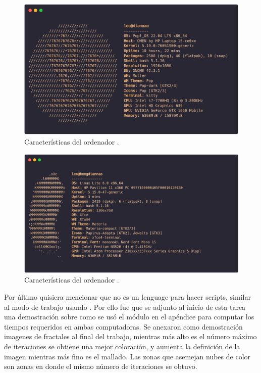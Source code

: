 \begin{figure}[ht!]
    \centering
    \includegraphics[scale=0.2]{../figures/diannao-specs}
    \caption{Características del ordenador {\diannao}.}
    \label{fig:diannao-specs}
\end{figure}
\begin{figure}[ht!]
    \centering
    \includegraphics[scale=0.2]{../figures/hongdiannao-specs}
    \caption{Características del ordenador {\hongdiannao}.}
    \label{fig:hongdiannao-specs}
\end{figure}
Por último quisiera mencionar que  no es un lenguage para hacer scripts, similar al modo de trabajo usando . Por ello fue que se adjunto al inicio de esta tarea una demostración sobre como se usó el módulo en el apéndice para computar los tiempos requeridos en ambas computadoras. Se anexaron como demostración imagenes de fractales al final del trabajo, mientras más alto es el número máximo de iteraciones se obtiene una mejor coloración, y aumenta la definición de la imagen mientras más fino es el mallado. Las zonas que asemejan nubes de color son zonas en donde el mismo número de iteraciones se obtuvo.

